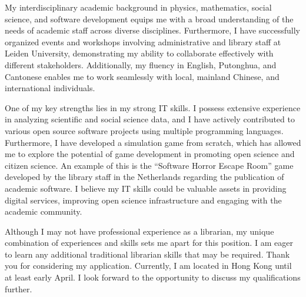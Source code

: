 \documentclass[11pt, a4paper]{awesome-cv}
\begin{document}
\begin{cvletter}
My interdisciplinary academic background in physics, mathematics, social science, and software development equips me with a broad understanding of the needs of academic staff across diverse disciplines. Furthermore, I have successfully organized events and workshops involving administrative and library staff at Leiden University, demonstrating my ability to collaborate effectively with different stakeholders. Additionally, my fluency in English, Putonghua, and Cantonese enables me to work seamlessly with local, mainland Chinese, and international individuals.

One of my key strengths lies in my strong IT skills. I possess extensive experience in analyzing scientific and social science data, and I have actively contributed to various open source software projects using multiple programming languages. Furthermore, I have developed a simulation game from scratch, which has allowed me to explore the potential of game development in promoting open science and citizen science. An example of this is the ``Software Horror Escape Room'' game developed by the library staff in the Netherlands regarding the publication of academic software. I believe my IT skills could be valuable assets in providing digital services, improving open science infrastructure and engaging with the academic community.

Although I may not have professional experience as a librarian, my unique combination of experiences and skills sets me apart for this position. I am eager to learn any additional traditional librarian skills that may be required. Thank you for considering my application. Currently, I am located in Hong Kong until at least early April. I look forward to the opportunity to discuss my qualifications further.


\end{cvletter}


\makeletterclosing
\end{document}
